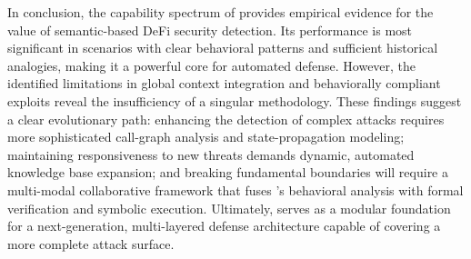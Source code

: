 In conclusion, the capability spectrum of \approach{} provides empirical evidence for the value of semantic-based DeFi security detection. Its performance is most significant in scenarios with clear behavioral patterns and sufficient historical analogies, making it a powerful core for automated defense. However, the identified limitations in global context integration and behaviorally compliant exploits reveal the insufficiency of a singular methodology. These findings suggest a clear evolutionary path: enhancing the detection of complex attacks requires more sophisticated call-graph analysis and state-propagation modeling; maintaining responsiveness to new threats demands dynamic, automated knowledge base expansion; and breaking fundamental boundaries will require a multi-modal collaborative framework that fuses \approach{}’s behavioral analysis with formal verification and symbolic execution. Ultimately, \approach{} serves as a modular foundation for a next-generation, multi-layered defense architecture capable of covering a more complete attack surface.
